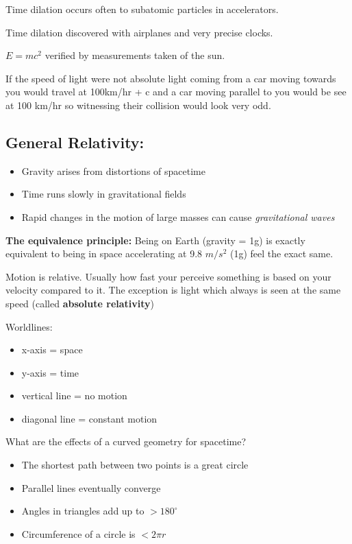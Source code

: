 Time dilation occurs often to subatomic particles in accelerators.

Time dilation discovered with airplanes and very precise clocks.

$E = mc^2$ verified by measurements taken of the sun.

If the speed of light were not absolute light coming from a car moving towards you would travel at 100km/hr + c and a car moving parallel to you would be see at 100 km/hr so witnessing their collision would look very odd.

\subsection{General Relativity:}

\begin{itemize}
    \item Gravity arises from distortions of spacetime
    \item Time runs slowly in gravitational fields
    \item Rapid changes in the motion of large masses can cause \emph{gravitational waves}
\end{itemize}

\textbf{The equivalence principle:} Being on Earth (gravity = 1g) is exactly equivalent to being in space accelerating at 9.8 $m/s^2$ (1g) feel the exact same.

Motion is relative. Usually how fast your perceive something is based on your velocity compared to it. The exception is light which always is seen at the same speed (called \textbf{absolute relativity})

Worldlines:
\begin{itemize}
    \item x-axis = space
    \item y-axis = time
    \item vertical line = no motion
    \item diagonal line = constant motion
\end{itemize}

What are the effects of a curved geometry for spacetime?
\begin{itemize}
    \item The shortest path between two points is a great circle
    \item Parallel lines eventually converge
    \item Angles in triangles add up to $> 180^\circ$
    \item Circumference of a circle is $< 2\pi r$
\end{itemize}

